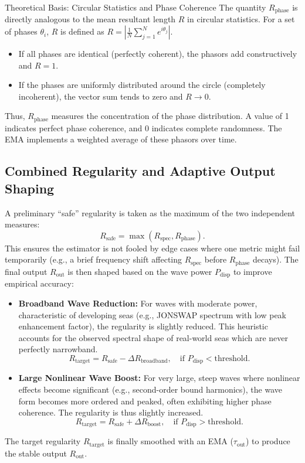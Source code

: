 \documentclass[11pt]{article}
\begin{document}
\begin{theorybox}{Theoretical Basis: Circular Statistics and Phase Coherence}
The quantity $R_{\text{phase}}$ is directly analogous to the mean resultant length $R$ in circular statistics. For a set of phases $\theta_i$, $R$ is defined as $R = | \frac{1}{N} \sum_{j=1}^{N} e^{i\theta_j} |$.
\begin{itemize}
    \item If all phases are identical (perfectly coherent), the phasors add constructively and $R = 1$.
    \item If the phases are uniformly distributed around the circle (completely incoherent), the vector sum tends to zero and $R \to 0$.
\end{itemize}
Thus, $R_{\text{phase}}$ measures the concentration of the phase distribution. A value of 1 indicates perfect phase coherence, and 0 indicates complete randomness. The EMA implements a weighted average of these phasors over time.
\end{theorybox}

\subsection{Combined Regularity and Adaptive Output Shaping}
A preliminary ``safe'' regularity is taken as the maximum of the two independent measures:
\begin{equation}
R_{\text{safe}} = \max(R_{\text{spec}}, R_{\text{phase}}).
\end{equation}
This ensures the estimator is not fooled by edge cases where one metric might fail temporarily (e.g., a brief frequency shift affecting $R_{\text{spec}}$ before $R_{\text{phase}}$ decays). The final output $R_{\text{out}}$ is then shaped based on the wave power $P_{\text{disp}}$ to improve empirical accuracy:
\begin{itemize}
    \item \textbf{Broadband Wave Reduction:} For waves with moderate power, characteristic of developing seas (e.g., JONSWAP spectrum with low peak enhancement factor), the regularity is slightly reduced. This heuristic accounts for the observed spectral shape of real-world seas which are never perfectly narrowband.
    \[
    R_{\text{target}} = R_{\text{safe}} - \Delta R_{\text{broadband}}, \quad \text{if } P_{\text{disp}} < \text{threshold}.
    \]
    \item \textbf{Large Nonlinear Wave Boost:} For very large, steep waves where nonlinear effects become significant (e.g., second-order bound harmonics), the wave form becomes more ordered and peaked, often exhibiting higher phase coherence. The regularity is thus slightly increased.
    \[
    R_{\text{target}} = R_{\text{safe}} + \Delta R_{\text{boost}}, \quad \text{if } P_{\text{disp}} > \text{threshold}.
    \]
\end{itemize}
The target regularity $R_{\text{target}}$ is finally smoothed with an EMA ($\tau_{\text{out}}$) to produce the stable output $R_{\text{out}}$.
\end{document}
